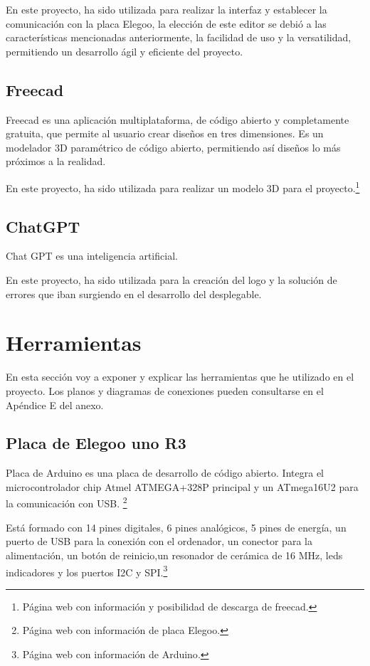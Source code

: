En este proyecto, ha sido utilizada para realizar la interfaz y establecer la comunicación con la placa Elegoo, la elección de este editor se debió a las características mencionadas anteriormente, la facilidad de uso y la versatilidad, permitiendo un desarrollo ágil y eficiente del proyecto.
\subsection{Freecad}
Freecad es una aplicación multiplataforma, de código abierto y completamente gratuita, que permite al usuario crear diseños en tres dimensiones.
Es un modelador 3D paramétrico de código abierto, permitiendo así diseños lo más próximos a la realidad.

En este proyecto, ha sido utilizada para realizar un modelo 3D para el proyecto.\cite{freecad}\footnote{Página web con información y posibilidad de descarga de freecad\cite{freecad}.} 
\subsection{ChatGPT}
Chat GPT es una inteligencia artificial.

En este proyecto, ha sido utilizada para la creación del logo y la solución de errores que iban surgiendo en el desarrollo del desplegable.
\section{Herramientas}
En esta sección voy a exponer y explicar las herramientas que he utilizado en el proyecto. Los planos y diagramas de conexiones pueden consultarse en el Apéndice E del anexo.
\subsection{Placa de Elegoo uno R3}
Placa de Arduino es una placa de desarrollo de código abierto. 
Integra el microcontrolador chip Atmel ATMEGA+328P principal y un ATmega16U2 para la comunicación con USB. \cite{Elegoo}\footnote{Página web con información de placa Elegoo\cite{Elegoo}.}

Está formado con 14 pines digitales, 6 pines analógicos, 5 pines de energía, un puerto de USB para la conexión con el ordenador, un conector para la alimentación, un botón de reinicio,un resonador de cerámica de 16 MHz, leds indicadores y los puertos I2C y SPI.\cite{Arduino}\footnote{Página web con información de Arduino\cite{Arduino}.}

